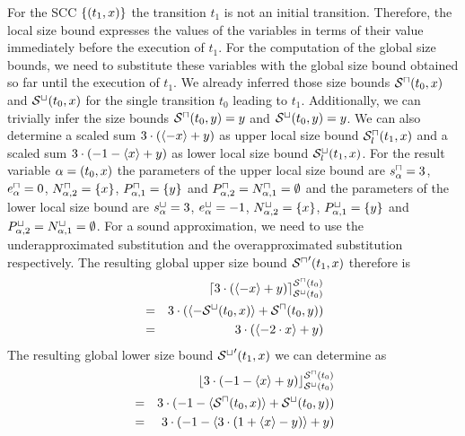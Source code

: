 \begin{example}
  For the SCC $\lbrace (t_1,x) \rbrace$ the transition $t_1$ is not an initial transition.
  Therefore, the local size bound expresses the values of the variables in terms of their value immediately before the execution of $t_1$.
  For the computation of the global size bounds, we need to substitute these variables with the global size bound obtained so far until the execution of $t_1$.
  We already inferred those size bounds ${\mathcal{S}^\sqcap}(t_0,x)$ and ${\mathcal{S}^\sqcup}(t_0,x)$ for the single transition $t_0$ leading to $t_1$.
  Additionally, we can trivially infer the size bounds ${\mathcal{S}^\sqcap}(t_0,y) = y$ and ${\mathcal{S}^\sqcup}(t_0,y) = y$.
  We can also determine a scaled sum $3 \cdot (\langle-x\rangle + y)$ as upper local size bound ${\mathcal{S}^\sqcap_l}(t_1,x)$ and a scaled sum $3 \cdot (-1 - \langle x\rangle + y)$ as lower local size bound ${\mathcal{S}^\sqcup_l}(t_1,x)$.
  For the result variable $\alpha = (t_0,x)$ the parameters of the upper local size bound are $s^\sqcap_\alpha = 3$, $e^\sqcap_\alpha = 0$, $N^\sqcap_{\alpha,2} = \lbrace x \rbrace$, $P^\sqcap_{\alpha,1} = \lbrace y \rbrace$ and $P^\sqcap_{\alpha,2} = N^\sqcap_{\alpha,1} = \emptyset$ and the parameters of the lower local size bound are $s^\sqcup_\alpha = 3$, $e^\sqcup_\alpha = -1$, $N^\sqcup_{\alpha,2} = \lbrace x \rbrace$, $P^\sqcup_{\alpha,1} = \lbrace y \rbrace$ and $P^\sqcup_{\alpha,2} = N^\sqcup_{\alpha,1} = \emptyset$.
  For a sound approximation, we need to use the underapproximated substitution and the overapproximated substitution respectively.
  The resulting global upper size bound ${\mathcal{S}^\sqcap}'(t_1,x)$ therefore is 
  \begin{align*}
    && \lceil 3 \cdot \left( \langle-x\rangle + y \right)  \rceil^{{\mathcal{S}^\sqcap}(t_0)}_{{\mathcal{S}^\sqcup}(t_0)} \\
    & = & 3 \cdot \left( \langle-{\mathcal{S}^\sqcup}(t_0, x)\rangle + {\mathcal{S}^\sqcap}(t_0, y) \right) \\
    & = & 3 \cdot \left( \langle-2 \cdot x\rangle + y \right)
  \end{align*}
  The resulting global lower size bound ${\mathcal{S}^\sqcup}'(t_1,x)$ we can determine as
  \begin{align*}
    && \lfloor 3 \cdot \left( -1 - \langle x\rangle + y \right)  \rfloor^{{\mathcal{S}^\sqcap}(t_0)}_{{\mathcal{S}^\sqcup}(t_0)} \\
    & = & 3 \cdot \left( -1 - \langle{\mathcal{S}^\sqcap}(t_0, x)\rangle + {\mathcal{S}^\sqcup}(t_0, y) \right) \\
    & = & 3 \cdot \left( -1 - \langle3 \cdot (1 + \langle x\rangle - y)\rangle + y \right)
  \end{align*}
\end{example}
